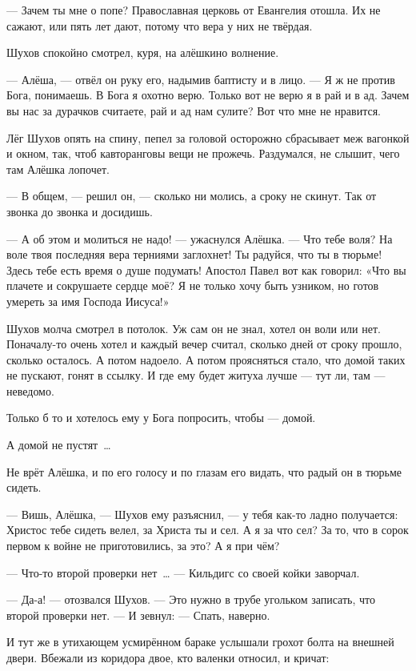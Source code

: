 --- Зачем ты мне о попе? Православная церковь от Евангелия отошла. Их не сажают, или пять лет дают, потому что вера у них не твёрдая.

Шухов спокойно смотрел, куря, на алёшкино волнение.

--- Алёша, --- отвёл он руку его, надымив баптисту и в лицо. --- Я ж не против Бога, понимаешь. В Бога я охотно верю. Только вот не верю я в рай и в ад. Зачем вы нас за дурачков считаете, рай и ад нам сулите? Вот что мне не нравится.

Лёг Шухов опять на спину, пепел за головой осторожно сбрасывает меж вагонкой и окном, так, чтоб кавторанговы вещи не прожечь. Раздумался, не слышит, чего там Алёшка лопочет.

--- В общем, --- решил он, --- сколько ни молись, а сроку не скинут. Так от звонка до звонка и досидишь.

--- А об этом и молиться не надо! --- ужаснулся Алёшка. --- Что тебе воля? На воле твоя последняя вера терниями заглохнет! Ты радуйся, что ты в тюрьме! Здесь тебе есть время о душе подумать! Апостол Павел вот как говорил: «Что вы плачете и сокрушаете сердце моё? Я не только хочу быть узником, но готов умереть за имя Господа Иисуса!»

Шухов молча смотрел в потолок. Уж сам он не знал, хотел он воли или нет. Поначалу-то очень хотел и каждый вечер считал, сколько дней от сроку прошло, сколько осталось. А потом надоело. А потом проясняться стало, что домой таких не пускают, гонят в ссылку. И где ему будет житуха лучше --- тут ли, там --- неведомо.

Только б то и хотелось ему у Бога попросить, чтобы --- домой.

А домой не пустят~\dots{}

Не врёт Алёшка, и по его голосу и по глазам его видать, что радый он в тюрьме сидеть.

--- Вишь, Алёшка, --- Шухов ему разъяснил, --- у тебя как-то ладно получается: Христос тебе сидеть велел, за Христа ты и сел. А я за что сел? За то, что в сорок первом к войне не приготовились, за это? А я при чём?

--- Что-то второй проверки нет~\dots{} --- Кильдигс со своей койки заворчал.

--- Да-а! --- отозвался Шухов. --- Это нужно в трубе угольком записать, что второй проверки нет. --- И зевнул: --- Спать, наверно.

И тут же в утихающем усмирённом бараке услышали грохот болта на внешней двери. Вбежали из коридора двое, кто валенки относил, и кричат:

